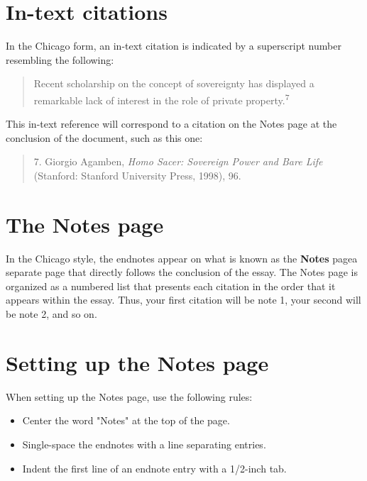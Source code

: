 \section {In-text citations}

In the Chicago form, an in-text citation is indicated by a superscript number
resembling the following:

\begin{quote} Recent scholarship on the concept of sovereignty has displayed a
remarkable lack of interest in the role of private property.\textsuperscript{7}
\end{quote}

\noindent This in-text reference will correspond to a citation on the Notes page
at the conclusion of the document, such as this one:

\begin{singlespace}
\begin{quote} \hspace{.4in}7. Giorgio Agamben, \emph{Homo Sacer: Sovereign Power
and Bare Life} (Stanford: Stanford University Press, 1998), 96. \end{quote}
\end{singlespace}

\section{The Notes page}

In the Chicago style, the endnotes appear on what is known as the \textbf{Notes}
page\textemdash a separate page that directly follows the conclusion of the
essay. The Notes page is organized as a numbered list that presents each
citation in the order that it appears within the essay. Thus, your first
citation will be note 1, your second will be note 2, and so on.

\section{Setting up the Notes page} When setting up the Notes page, use the
following rules:

\begin{itemize} \item Center the word "Notes" at the top of the page. \item
Single-space the endnotes with a line separating entries. \item Indent the first
line of an endnote entry with a 1/2-inch tab. \end{itemize}


